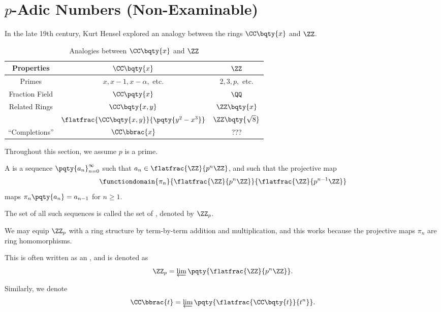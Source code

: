 \section{\(p\)-Adic Numbers (Non-Examinable)}

In the late 19th century, Kurt Hensel explored an analogy between the rings \(\CC\bqty{x}\) and \(\ZZ\).

\begin{table}[ht!]
    \centering
    \begin{tabular}{c|cc}
        Properties & \(\CC\bqty{x}\) & \(\ZZ\) \\
        \hline\hline
        Primes & \(x, x - 1, x - \alpha, \) etc. & \(2, 3, p, \) etc. \\
        Fraction Field & \(\CC\pqty{x}\) & \(\QQ\) \\
        Related Rings & \(\CC\bqty{x, y}\) & \(\ZZ\bqty{x}\) \\
         & \(\flatfrac{\CC\bqty{x, y}}{\pqty{y^2 - x^3}}\) & \(\ZZ\bqty{\sqrt{8}}\) \\
        ``Completions'' & \(\CC\bbrac{x}\) & ???
    \end{tabular}
    \caption{Analogies between \(\CC\bqty{x}\) and \(\ZZ\)}
    \label{tab:analogy-cx-z}
\end{table}

Throughout this section, we assume \(p\) is a prime.

\begin{definition}
    \label{def:p-adic-integer}%
    A  is a sequence \(\pqty{a_n}_{n = 0}^{\infty}\) such that \(a_n \in \flatfrac{\ZZ}{p^n \ZZ}\), and such that the projective map
    \[
        \functiondomain{\pi_n}{\flatfrac{\ZZ}{p^n \ZZ}}{\flatfrac{\ZZ}{p^{n - 1} \ZZ}}
    \]
    maps \(\pi_n \pqty{a_n} = a_{n - 1}\) for \(n \geq 1\).

    The set of all such sequences is called the set of , denoted by \(\ZZ_p\).
\end{definition}

We may equip \(\ZZ_p\) with a ring structure by term-by-term addition and multiplication, and this works because the projective maps \(\pi_n\) are ring homomorphisms.

\begin{remark}
    This is often written as an , and is denoted as
    \[
        \ZZ_p = \varprojlim \pqty{\flatfrac{\ZZ}{p^n \ZZ}}.
    \]

    Similarly, we denote
    \[
        \CC\bbrac{t} = \varprojlim \pqty{\flatfrac{\CC\bqty{t}}{t^n}}.
    \]
\end{remark}

